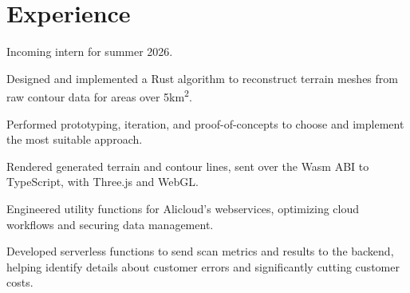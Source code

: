 \section{Experience}

\begin{resumeItem}
\begin{resumeList}
    \item Incoming intern for summer 2026.
\end{resumeList}
\end{resumeItem}

\begin{resumeItem}
\begin{resumeList}
    \item Designed and implemented a Rust algorithm to reconstruct terrain meshes from raw contour data for areas over 5km\textsuperscript{2}.
    \item Performed prototyping, iteration, and proof-of-concepts to choose and implement the most suitable approach.
    \item Rendered generated terrain and contour lines, sent over the Wasm ABI to TypeScript, with Three.js and WebGL.
\end{resumeList}
\end{resumeItem}

\begin{resumeItem}
\begin{resumeList}
    \item Engineered utility functions for Alicloud's webservices, optimizing cloud workflows and securing data management.
    \item Developed serverless functions to send scan metrics and results to the backend, helping identify details about customer errors and significantly cutting customer costs.
\end{resumeList}
\end{resumeItem}

